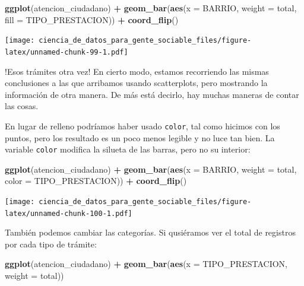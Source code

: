 \documentclass[]{book}
\newenvironment{Shaded}{\begin{snugshade}}{\end{snugshade}}
\newcommand{\KeywordTok}[1]{\textcolor[rgb]{0.13,0.29,0.53}{\textbf{#1}}}
\newcommand{\DataTypeTok}[1]{\textcolor[rgb]{0.13,0.29,0.53}{#1}}
\newcommand{\StringTok}[1]{\textcolor[rgb]{0.31,0.60,0.02}{#1}}
\newcommand{\OperatorTok}[1]{\textcolor[rgb]{0.81,0.36,0.00}{\textbf{#1}}}
\newcommand{\NormalTok}[1]{#1}
\begin{document}
\begin{Shaded}
\begin{Highlighting}[]
\KeywordTok{ggplot}\NormalTok{(atencion_ciudadano) }\OperatorTok{+}
\StringTok{    }\KeywordTok{geom_bar}\NormalTok{(}\KeywordTok{aes}\NormalTok{(}\DataTypeTok{x =}\NormalTok{ BARRIO, }\DataTypeTok{weight =}\NormalTok{ total, }\DataTypeTok{fill =}\NormalTok{ TIPO_PRESTACION)) }\OperatorTok{+}
\StringTok{    }\KeywordTok{coord_flip}\NormalTok{()}
\end{Highlighting}
\end{Shaded}

\texttt{[image: ciencia\_de\_datos\_para\_gente\_sociable\_files/figure-latex/unnamed-chunk-99-1.pdf]}

!Esos trámites otra vez! En cierto modo, estamos recorriendo las mismas
conclusiones a las que arribamos usando scatterplots, pero mostrando la
información de otra manera. De más está decirlo, hay muchas maneras de
contar las cosas.

En lugar de relleno podríamos haber usado \texttt{color}, tal como
hicimos con los puntos, pero los resultado es un poco menos legible y no
luce tan bien. La variable \texttt{color} modifica la silueta de las
barras, pero no su interior:

\begin{Shaded}
\begin{Highlighting}[]
\KeywordTok{ggplot}\NormalTok{(atencion_ciudadano) }\OperatorTok{+}
\StringTok{    }\KeywordTok{geom_bar}\NormalTok{(}\KeywordTok{aes}\NormalTok{(}\DataTypeTok{x =}\NormalTok{ BARRIO, }\DataTypeTok{weight =}\NormalTok{ total, }\DataTypeTok{color =}\NormalTok{ TIPO_PRESTACION)) }\OperatorTok{+}
\StringTok{    }\KeywordTok{coord_flip}\NormalTok{()}
\end{Highlighting}
\end{Shaded}

\texttt{[image: ciencia\_de\_datos\_para\_gente\_sociable\_files/figure-latex/unnamed-chunk-100-1.pdf]}

También podemos cambiar las categorías. Si qusiéramos ver el total de
registros por cada tipo de trámite:

\begin{Shaded}
\begin{Highlighting}[]
\KeywordTok{ggplot}\NormalTok{(atencion_ciudadano) }\OperatorTok{+}
\StringTok{    }\KeywordTok{geom_bar}\NormalTok{(}\KeywordTok{aes}\NormalTok{(}\DataTypeTok{x =}\NormalTok{ TIPO_PRESTACION, }\DataTypeTok{weight =}\NormalTok{ total)) }
\end{Highlighting}
\end{Shaded}
\end{document}
